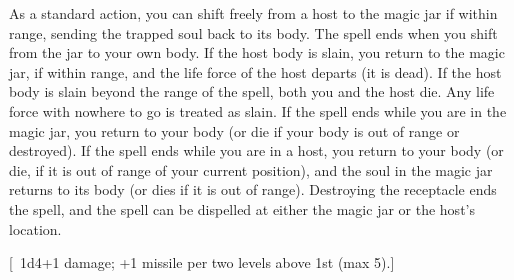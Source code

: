 {As a standard action, you can shift freely from a host to the magic jar if within range, sending the trapped soul back to its body. The spell ends when you shift from the jar to your own body.
If the host body is slain, you return to the magic jar, if within range, and the life force of the host departs (it is dead). If the host body is slain beyond the range of the spell, both you and the host die. Any life force with nowhere to go is treated as slain.
If the spell ends while you are in the magic jar, you return to your body (or die if your body is out of range or destroyed). If the spell ends while you are in a host, you return to your body (or die, if it is out of range of your current position), and the soul in the magic jar returns to its body (or dies if it is out of range). Destroying the receptacle ends the spell, and the spell can be dispelled at either the magic jar or the host's location.}
        
[ 1d4+1 damage; +1 missile per two levels above 1st (max 5).]
        
